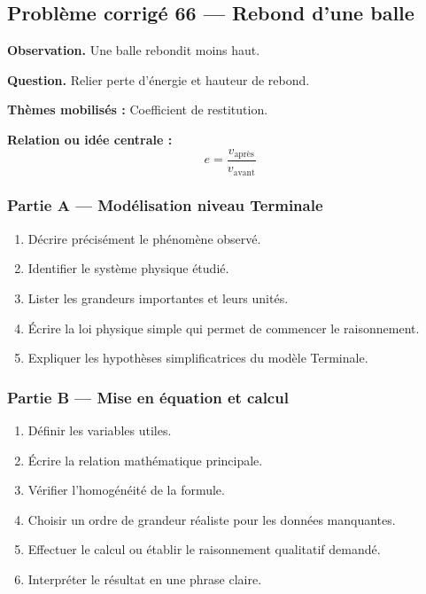 \documentclass[11pt,a4paper]{article}
\begin{document}
\subsection{Problème corrigé 66 — Rebond d'une balle}

\begin{exercicebox}
\textbf{Observation.} Une balle rebondit moins haut.

\medskip
\textbf{Question.} Relier perte d'énergie et hauteur de rebond.

\medskip
\textbf{Thèmes mobilisés :} Coefficient de restitution.

\medskip
\textbf{Relation ou idée centrale :}
\[
e=\frac{v_{\mathrm{après}}}{v_{\mathrm{avant}}}
\]
\end{exercicebox}

\subsubsection*{Partie A — Modélisation niveau Terminale}

\begin{enumerate}
  \item Décrire précisément le phénomène observé.
  \item Identifier le système physique étudié.
  \item Lister les grandeurs importantes et leurs unités.
  \item Écrire la loi physique simple qui permet de commencer le raisonnement.
  \item Expliquer les hypothèses simplificatrices du modèle Terminale.
\end{enumerate}

\subsubsection*{Partie B — Mise en équation et calcul}

\begin{enumerate}
  \item Définir les variables utiles.
  \item Écrire la relation mathématique principale.
  \item Vérifier l'homogénéité de la formule.
  \item Choisir un ordre de grandeur réaliste pour les données manquantes.
  \item Effectuer le calcul ou établir le raisonnement qualitatif demandé.
  \item Interpréter le résultat en une phrase claire.
\end{enumerate}
\end{document}
